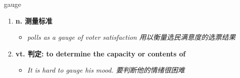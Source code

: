 
\begin{frame}
{\huge gauge}
\begin{center}
\begin{enumerate}\Large
  \item \textbf{n. 测量标准}
  \begin{itemize}
    \item \em{\Large{polls as a gauge of voter satisfaction 用以衡量选民满意度的选票结果}}
  \end{itemize}
  \item \textbf{vt. 判定: to determine the capacity or contents of}
  \begin{itemize}
    \item \em{\Large{It is hard to gauge his mood. 要判断他的情绪很困难}}
  \end{itemize}
\end{enumerate}
\end{center}
\end{frame}
